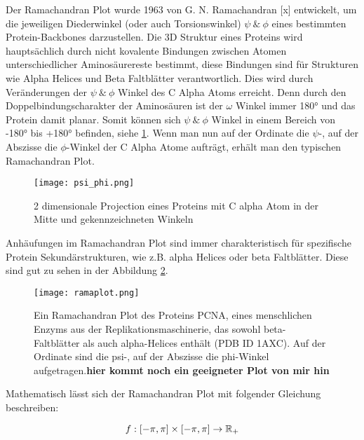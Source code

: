 Der Ramachandran Plot wurde 1963 von G. N. Ramachandran [x] entwickelt, um die jeweiligen Diederwinkel (oder auch Torsionswinkel)  $\psi\ \&\ \phi$ eines bestimmten Protein-Backbones darzustellen. Die 3D Struktur eines Proteins wird hauptsächlich durch nicht kovalente Bindungen zwischen Atomen unterschiedlicher Aminosäurereste bestimmt, diese Bindungen sind für Strukturen wie Alpha Helices und Beta Faltblätter verantwortlich. Dies wird durch Veränderungen der  $\psi\ \&\ \phi$ Winkel des C Alpha Atoms erreicht. Denn durch den Doppelbindungscharakter der Aminosäuren ist der $\omega$ Winkel immer 180° und das Protein damit planar. Somit können sich $\psi\ \&\ \phi$ Winkel in einem Bereich von -180° bis +180° befinden, siehe \ref{fig:psi_phi}. Wenn man nun auf der Ordinate die $\psi$-, auf der Abszisse die $\phi$-Winkel der C Alpha Atome aufträgt, erhält man den typischen Ramachandran Plot. 

\begin{figure}
\texttt{[image: psi\_phi.png]}
\caption{2 dimensionale Projection eines Proteins mit C alpha Atom in der Mitte und gekennzeichneten Winkeln\protect\footnotemark}
\label{fig:psi_phi}
\end{figure}

Anhäufungen im Ramachandran Plot sind immer charakteristisch für spezifische Protein Sekundärstrukturen, wie z.B. alpha Helices oder beta Faltblätter. Diese sind gut zu sehen in der Abbildung \ref{fig:ramaplot}.

\begin{figure}
\texttt{[image: ramaplot.png]}
\caption{Ein Ramachandran Plot des Proteins PCNA, eines menschlichen Enzyms aus der Replikationsmaschinerie, das sowohl beta-Faltblätter als auch alpha-Helices enthält (PDB ID 1AXC). Auf der Ordinate sind die psi-, auf der Abszisse die phi-Winkel aufgetragen.\protect\footnotemark \textbf{hier kommt noch ein geeigneter Plot von mir hin}}
\label{fig:ramaplot}
\end{figure}

Mathematisch lässt sich der Ramachandran Plot mit folgender Gleichung beschreiben:

\begin{equation}
    f : [-\pi,\pi]\times[-\pi,\pi] \rightarrow \mathbb{R}_{+}
    \label{eq:rama_eq}
\end{equation}



